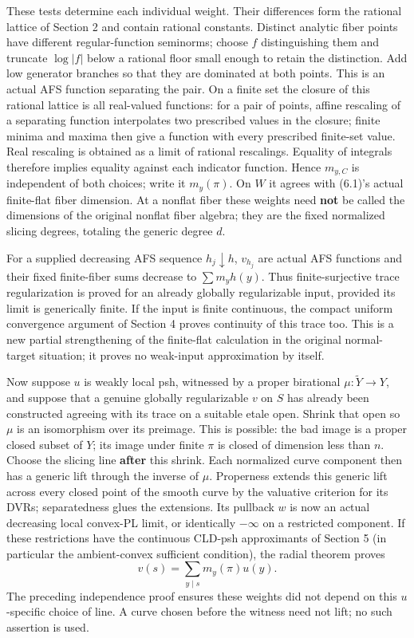\documentclass[
  10pt,
]{article}
\begin{document}
These tests determine each individual weight. Their differences form the
rational lattice of Section 2 and contain rational constants. Distinct
analytic fiber points have different regular-function seminorms; choose
\(f\) distinguishing them and truncate \(\log|f|\) below a rational
floor small enough to retain the distinction. Add low generator branches
so that they are dominated at both points. This is an actual AFS
function separating the pair. On a finite set the closure of this
rational lattice is all real-valued functions: for a pair of points,
affine rescaling of a separating function interpolates two prescribed
values in the closure; finite minima and maxima then give a function
with every prescribed finite-set value. Real rescaling is obtained as a
limit of rational rescalings. Equality of integrals therefore implies
equality against each indicator function. Hence \(m_{y,C}\) is
independent of both choices; write it \(m_y(\pi)\). On \(W\) it agrees
with (6.1)'s actual finite-flat fiber dimension. At a nonflat fiber
these weights need \textbf{not} be called the dimensions of the original
nonflat fiber algebra; they are the fixed normalized slicing degrees,
totaling the generic degree \(d\).

For a supplied decreasing AFS sequence \(h_j\downarrow h\), \(v_{h_j}\)
are actual AFS functions and their fixed finite-fiber sums decrease to
\(\sum m_yh(y)\). Thus finite-surjective trace regularization is proved
for an already globally regularizable input, provided its limit is
generically finite. If the input is finite continuous, the compact
uniform convergence argument of Section 4 proves continuity of this
trace too. This is a new partial strengthening of the finite-flat
calculation in the original normal-target situation; it proves no
weak-input approximation by itself.

Now suppose \(u\) is weakly local psh, witnessed by a proper birational
\(\mu:\widetilde Y\to Y\), and suppose that a genuine globally
regularizable \(v\) on \(S\) has already been constructed agreeing with
its trace on a suitable etale open. Shrink that open so \(\mu\) is an
isomorphism over its preimage. This is possible: the bad image is a
proper closed subset of \(Y\); its image under finite \(\pi\) is closed
of dimension less than \(n\). Choose the slicing line \textbf{after}
this shrink. Each normalized curve component then has a generic lift
through the inverse of \(\mu\). Properness extends this generic lift
across every closed point of the smooth curve by the valuative criterion
for its DVRs; separatedness glues the extensions. Its pullback \(w\) is
now an actual decreasing local convex-PL limit, or identically
\(-\infty\) on a restricted component. If these restrictions have the
continuous CLD-psh approximants of Section 5 (in particular the
ambient-convex sufficient condition), the radial theorem proves
\[v(s)=\sum_{y\mid s}m_y(\pi)u(y).\] The preceding independence proof
ensures these weights did not depend on this \(u\)-specific choice of
line. A curve chosen before the witness need not lift; no such assertion
is used.
\end{document}

